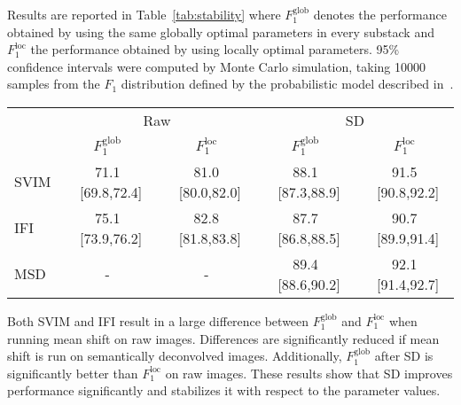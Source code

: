 \documentclass[smallextended]{svjour3}       %
\begin{document}
Results are reported
in Table~\ref{tab:stability} where $F_1^{\mathrm{glob}}$ denotes the
performance obtained by using the same globally optimal parameters in
every substack and $F_1^{\mathrm{loc}}$ the performance obtained by
using locally optimal parameters. 95\% confidence intervals were
computed by Monte Carlo simulation, taking 10000 samples from the
$F_1$ distribution defined by the probabilistic model described
in~\cite{goutte_probabilistic_2005}.
\newcommand\ci[3]{#1 ~[#2,#3]}
\begin{table*}
  \centering
  \begin{tabular}{l c c c c}
    ~  &\multicolumn{2}{c}{Raw}& \multicolumn{2}{c}{SD} \\
    ~ & $F_1^{\mathrm{glob}}$  & $F_1^{\mathrm{loc}}$ & $F_1^{\mathrm{glob}}$ & $F_1^{\mathrm{loc}}$ \\
    \hline\noalign{\smallskip}
    SVIM& 71.1 ~[69.8,72.4]    & 81.0 ~[80.0,82.0]    & 88.1 ~[87.3,88.9]    & 91.5 ~[90.8,92.2]\\
    IFI & 75.1 ~[73.9,76.2]    & 82.8 ~[81.8,83.8]    & 87.7 ~[86.8,88.5]    & 90.7 ~[89.9,91.4]\\
    MSD& -    & -    & 89.4 ~[88.6,90.2]    & 92.1 ~[91.4,92.7]\\
  \end{tabular}
  \caption{Stability of mean shift (95\% confidence intervals in brackets).}
  \label{tab:stability}
\end{table*}
Both SVIM and IFI result in a large difference between
$F_1^{\mathrm{glob}}$ and $F_1^{\mathrm{loc}}$ when running mean shift on raw
images. Differences are significantly reduced if mean shift is run
on semantically deconvolved images. Additionally, $F_1^{\mathrm{glob}}$
after SD is significantly better than $F_1^{\mathrm{loc}}$ on raw
images. These results show that SD improves performance significantly and stabilizes it with respect to
the parameter values.
\end{document}
